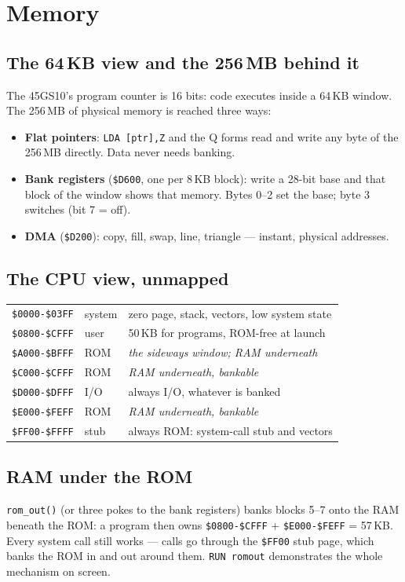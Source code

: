 \chapter{Memory}\label{cha:memory}

\section{The 64\,KB view and the 256\,MB behind it}
The 45GS10's program counter is 16 bits: code executes inside a 64\,KB
window. The 256\,MB of physical memory is reached three ways:
\begin{itemize}[leftmargin=1.4em]
\item \textbf{Flat pointers}: \verb|LDA [ptr],Z| and the Q forms read and
  write any byte of the 256\,MB directly. Data never needs banking.
\item \textbf{Bank registers} (\verb|$D600|, one per 8\,KB block): write a
  28-bit base and that block of the window shows that memory. Bytes 0--2 set
  the base; byte 3 switches (bit 7 = off).
\item \textbf{DMA} (\verb|$D200|): copy, fill, swap, line, triangle ---
  instant, physical addresses.
\end{itemize}

\section{The CPU view, unmapped}
\begin{center}
\begin{tabular}{@{}lll@{}}
\toprule
\texttt{\$0000-\$03FF} & system & zero page, stack, vectors, low system state\\
\texttt{\$0800-\$CFFF} & user   & 50\,KB for programs, ROM-free at launch\\
\texttt{\$A000-\$BFFF} & ROM    & \emph{the sideways window; RAM underneath}\\
\texttt{\$C000-\$CFFF} & ROM    & \emph{RAM underneath, bankable}\\
\texttt{\$D000-\$DFFF} & I/O    & always I/O, whatever is banked\\
\texttt{\$E000-\$FEFF} & ROM    & \emph{RAM underneath, bankable}\\
\texttt{\$FF00-\$FFFF} & stub   & always ROM: system-call stub and vectors\\
\bottomrule
\end{tabular}
\end{center}

\section{RAM under the ROM}
\verb|rom_out()| (or three pokes to the bank registers) banks blocks 5--7
onto the RAM beneath the ROM: a program then owns
\texttt{\$0800-\$CFFF} + \texttt{\$E000-\$FEFF} = 57\,KB. Every system call
still works --- calls go through the \texttt{\$FF00} stub page, which banks
the ROM in and out around them. \verb|RUN romout| demonstrates the whole
mechanism on screen.

